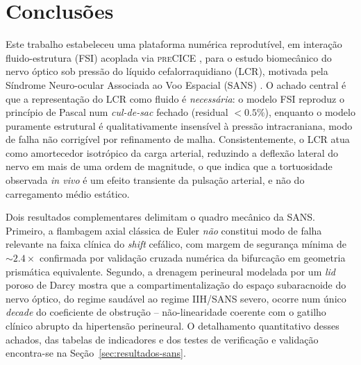 %
%

\section{Conclusões}
\label{sec:conclusoes}

Este trabalho estabeleceu uma plataforma numérica reprodutível, em interação fluido-estrutura (FSI) acoplada via \textsc{preCICE} \citep{Chourdakis2022, Bungartz2016}, para o estudo biomecânico do nervo óptico sob pressão do líquido cefalorraquidiano (LCR), motivada pela Síndrome Neuro-ocular Associada ao Voo Espacial (SANS) \citep{Lee2020NPJ, Mader2011}. O achado central é que a representação do LCR como fluido é \emph{necessária}: o modelo FSI reproduz o princípio de Pascal num \emph{cul-de-sac} fechado (residual $< 0.5\%$), enquanto o modelo puramente estrutural é qualitativamente insensível à pressão intracraniana, modo de falha não corrigível por refinamento de malha. Consistentemente, o LCR atua como amortecedor isotrópico da carga arterial, reduzindo a deflexão lateral do nervo em mais de uma ordem de magnitude, o que indica que a tortuosidade observada \emph{in vivo} é um efeito transiente da pulsação arterial, e não do carregamento médio estático.

Dois resultados complementares delimitam o quadro mecânico da SANS. Primeiro, a flambagem axial clássica de Euler \emph{não} constitui modo de falha relevante na faixa clínica do \emph{shift} cefálico, com margem de segurança mínima de $\sim 2.4\times$ confirmada por validação cruzada numérica da bifurcação em geometria prismática equivalente. Segundo, a drenagem perineural modelada por um \emph{lid} poroso de Darcy mostra que a compartimentalização do espaço subaracnoide do nervo óptico, do regime saudável ao regime IIH/SANS severo, ocorre num único \emph{decade} do coeficiente de obstrução -- não-linearidade coerente com o gatilho clínico abrupto da hipertensão perineural. O detalhamento quantitativo desses achados, das tabelas de indicadores e dos testes de verificação e validação encontra-se na Seção~\ref{sec:resultados-sans}.

